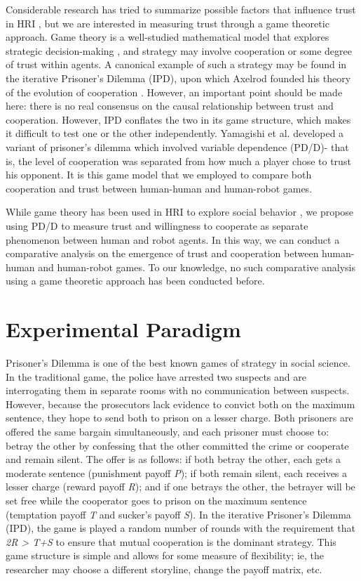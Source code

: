 \documentclass{sig-alternate}
\begin{document}
Considerable research has tried to summarize possible factors that influence trust in HRI \cite{yagoda2012you} \cite{billings2012human}, but  we are interested in measuring trust through a game theoretic approach. Game theory is a well-studied mathematical model that explores strategic decision-making \cite{myerson1991game}, and strategy may involve cooperation or some degree of trust within agents. A canonical example of such a strategy may be found in the iterative Prisoner's Dilemma (IPD), upon which Axelrod founded his theory of the evolution of cooperation \cite{axelrod1981evolution}. However, an important point should be made here: there is no real consensus on the causal relationship between trust and cooperation. However, IPD conflates the two in its game structure, which makes it difficult to test one or the other independently. Yamagishi et al. \cite{yamagishi2005separating} developed a variant of prisoner's dilemma which involved variable dependence (PD/D)- that is, the level of cooperation was separated from how much a player chose to trust his opponent. It is this game model that we employed to compare both cooperation and trust between human-human and human-robot games.

While game theory has been used in HRI to explore social behavior \cite{lee2008human} \cite{broz2008planning} \cite{mathur2009uncanny}, we propose using PD/D to measure trust and willingness to cooperate as separate phenomenon between human and robot agents. In this way, we can conduct a comparative analysis on the emergence of trust and cooperation between human-human and human-robot games. To our knowledge, no such comparative analysis using a game theoretic approach has been conducted before.

\section{Experimental Paradigm}
Prisoner's Dilemma is one of the best known games of strategy in social science. In the traditional game, the police have arrested two suspects and are interrogating them in separate rooms with no communication between suspects. However, because the prosecutors lack evidence to convict both on the maximum sentence, they hope to send both to prison on a lesser charge. Both prisoners are offered the same bargain simultaneously, and each prisoner must choose to: betray the other by confessing that the other committed the crime or cooperate and remain silent. The offer is as follows: if both betray the other, each gets a moderate sentence (punishment payoff \textit{P}); if both remain silent, each receives a lesser charge (reward payoff \textit{R}); and if one betrays the other, the betrayer will be set free while the cooperator goes to prison on the maximum sentence (temptation payoff \textit{T} and sucker's payoff \textit{S}). In the iterative Prisoner's Dilemma (IPD), the game is played a random number of rounds with the requirement that \textit{2R > T+S} to ensure that mutual cooperation is the dominant strategy. This game structure is simple and allows for some measure of flexibility; ie, the researcher may choose a different storyline, change the payoff matrix, etc.
\end{document}
